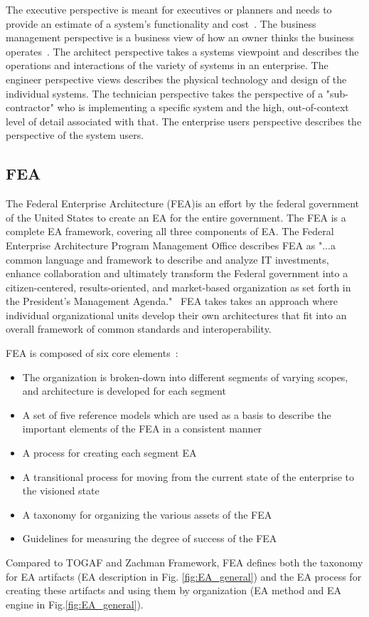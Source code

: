 The executive perspective is meant for executives or planners and needs to provide an estimate of a system's functionality and cost~\cite{jungle2004}. The business management perspective is a business view of how an owner thinks the business operates~\cite{Zachman2000}. The architect perspective takes a systems viewpoint and describes the operations and interactions of the variety of systems in an enterprise. The engineer perspective views describes the physical technology and design of the individual systems. The technician perspective takes the perspective of a "sub-contractor" who is implementing a specific system and the high, out-of-context level of detail associated with that. The enterprise users perspective describes the perspective of the system users. 
 


\subsection{FEA}
The Federal Enterprise Architecture (FEA)is an effort by the federal government of the United States to create an EA for the entire government. The FEA is a complete EA framework, covering all three components of EA. The Federal Enterprise Architecture Program Management Office describes FEA as "...a common language and framework to describe and analyze IT investments, enhance collaboration and ultimately transform the Federal government into a citizen-centered, results-oriented, and market-based organization as set forth in the President's Management Agenda."~\cite{FEA_PMO2007} FEA takes takes an approach where individual organizational units develop their own architectures that fit into an overall framework of common standards and interoperability.

FEA is composed of six core elements~\cite{sessions2007}:
\begin{itemize}
    \item The organization is broken-down into different segments of varying scopes, and architecture is developed for each segment
    \item A set of five reference models which are used as a basis to describe the important elements of the FEA in a consistent manner
    \item A process for creating each segment EA
    \item A transitional process for moving from the current state of the enterprise to the visioned state
    \item A taxonomy for organizing the various assets of the FEA
    \item Guidelines for measuring the degree of success of the FEA
\end{itemize}
Compared to TOGAF and Zachman Framework, FEA defines both the taxonomy for EA artifacts (EA description in Fig. \ref{fig:EA_general}) and the EA process for creating these artifacts and using them by organization (EA method and EA engine in Fig.\ref{fig:EA_general}). 

